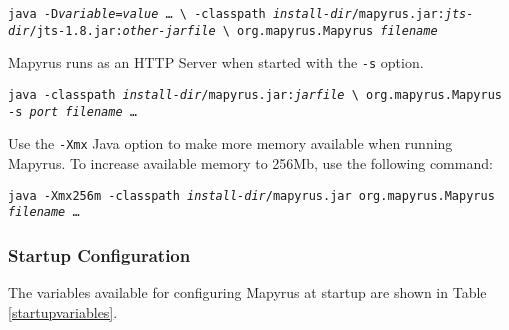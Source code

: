 \begin{alltt}
\texttt{java -D\textit{variable}=\textit{value} \dots\ \textbackslash
  -classpath \textit{install-dir}/mapyrus.jar:\textit{jts-dir}/jts-1.8.jar:\textit{other-jarfile} \textbackslash
  org.mapyrus.Mapyrus \textit{filename}}
\end{alltt}

Mapyrus runs as an HTTP Server when started with the
\texttt{-s} option.

\begin{alltt}
\texttt{java -classpath \textit{install-dir}/mapyrus.jar:\textit{jarfile} \textbackslash
  org.mapyrus.Mapyrus -s \textit{port} \textit{filename} \dots}
\end{alltt}

\label{morememory}
Use the
\texttt{-Xmx} Java option
to make more memory available when running Mapyrus.
To increase available memory to 256Mb, use the following command:

\begin{alltt}
\texttt{java -Xmx256m -classpath \textit{install-dir}/mapyrus.jar org.mapyrus.Mapyrus \textit{filename} \dots}
\end{alltt}

\subsubsection{Startup Configuration}

The variables available for configuring Mapyrus at startup are
shown in Table \ref{startupvariables}.

